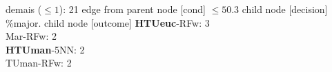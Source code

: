 {{{{%
demais ($\leq 1$): 21} edge from parent node [cond] {$\leq50.3$}}
child {node [decision] {\%major.}
child {node [outcome] {
\textbf{HTUeuc}-RFw: 3\\
Mar-RFw: 2\\
\textbf{HTUman}-5NN: 2\\
TUman-RFw: 2\\
}}}}}
